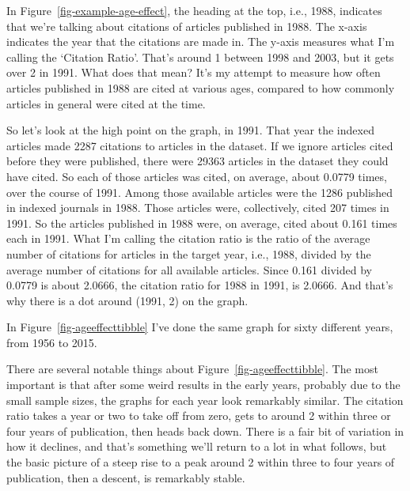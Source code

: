 \documentclass[
  10pt,
  letterpaper,
  DIV=11,
  numbers=noendperiod,
  twoside]{scrartcl}
\makeatletter
\newcommand*\pandocbounded[1]{%
  \sbox\pandoc@box{#1}%
  \Gscale@div\@tempa{\textheight}{\dimexpr\ht\pandoc@box+\dp\pandoc@box\relax}%
  \Gscale@div\@tempb{\linewidth}{\wd\pandoc@box}%
  \ifdim\@tempb\p@<\@tempa\p@\let\@tempa\@tempb\fi%
  \ifdim\@tempa\p@<\p@\scalebox{\@tempa}{\usebox\pandoc@box}%
  \else\usebox{\pandoc@box}%
  \fi%
}
\makeatother
\begin{document}
In Figure~\ref{fig-example-age-effect}, the heading at the top, i.e.,
1988, indicates that we're talking about citations of articles published
in 1988. The x-axis indicates the year that the citations are made in.
The y-axis measures what I'm calling the `Citation Ratio'. That's around
1 between 1998 and 2003, but it gets over 2 in 1991. What does that
mean? It's my attempt to measure how often articles published in 1988
are cited at various ages, compared to how commonly articles in general
were cited at the time.

So let's look at the high point on the graph, in 1991. That year the
indexed articles made 2287 citations to articles in the dataset. If we
ignore articles cited before they were published, there were 29363
articles in the dataset they could have cited. So each of those articles
was cited, on average, about 0.0779 times, over the course of 1991.
Among those available articles were the 1286 published in indexed
journals in 1988. Those articles were, collectively, cited 207 times in
1991. So the articles published in 1988 were, on average, cited about
0.161 times each in 1991. What I'm calling the citation ratio is the
ratio of the average number of citations for articles in the target
year, i.e., 1988, divided by the average number of citations for all
available articles. Since 0.161 divided by 0.0779 is about 2.0666, the
citation ratio for 1988 in 1991, is 2.0666. And that's why there is a
dot around (1991, 2) on the graph.

In Figure~\ref{fig-ageeffecttibble} I've done the same graph for sixty
different years, from 1956 to 2015.

\begin{figure*}

\centering{

\pandocbounded{\texttt{[image: apc\_files/figure-pdf/fig-ageeffecttibble-1.pdf]}}

}

\caption{\label{fig-ageeffecttibble}Each facet shows the relative
citation rate for articles published that year at different ages.}

\end{figure*}%

There are several notable things about Figure~\ref{fig-ageeffecttibble}.
The most important is that after some weird results in the early years,
probably due to the small sample sizes, the graphs for each year look
remarkably similar. The citation ratio takes a year or two to take off
from zero, gets to around 2 within three or four years of publication,
then heads back down. There is a fair bit of variation in how it
declines, and that's something we'll return to a lot in what follows,
but the basic picture of a steep rise to a peak around 2 within three to
four years of publication, then a descent, is remarkably stable.
\end{document}
